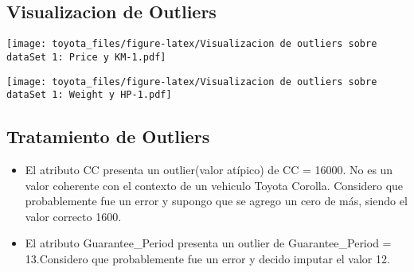 \documentclass[]{article}
\newenvironment{Shaded}{\begin{snugshade}}{\end{snugshade}}
\newcommand{\DataTypeTok}[1]{\textcolor[rgb]{0.13,0.29,0.53}{#1}}
\newcommand{\DecValTok}[1]{\textcolor[rgb]{0.00,0.00,0.81}{#1}}
\newcommand{\KeywordTok}[1]{\textcolor[rgb]{0.13,0.29,0.53}{\textbf{#1}}}
\newcommand{\NormalTok}[1]{#1}
\newcommand{\OperatorTok}[1]{\textcolor[rgb]{0.81,0.36,0.00}{\textbf{#1}}}
\newcommand{\StringTok}[1]{\textcolor[rgb]{0.31,0.60,0.02}{#1}}
\begin{document}
\hypertarget{visualizacion-de-outliers}{%
\subsection{Visualizacion de Outliers}\label{visualizacion-de-outliers}}

\begin{Shaded}
\end{Shaded}

\texttt{[image: toyota\_files/figure-latex/Visualizacion de outliers sobre dataSet 1: Price y KM-1.pdf]}

\begin{Shaded}
\end{Shaded}

\texttt{[image: toyota\_files/figure-latex/Visualizacion de outliers sobre dataSet 1: Weight y HP-1.pdf]}

\hypertarget{tratamiento-de-outliers}{%
\subsection{Tratamiento de Outliers}\label{tratamiento-de-outliers}}

\begin{itemize}
\item
  El atributo CC presenta un outlier(valor atípico) de CC = 16000. No es
  un valor coherente con el contexto de un vehiculo Toyota Corolla.
  Considero que probablemente fue un error y supongo que se agrego un
  cero de más, siendo el valor correcto 1600.
\item
  El atributo Guarantee\_Period presenta un outlier de Guarantee\_Period
  = 13.Considero que probablemente fue un error y decido imputar el
  valor 12.
\end{itemize}
\end{document}
